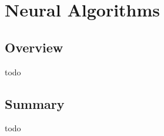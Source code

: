 


\chapter{Neural Algorithms}
\label{ch:neural}

\section{Overview}
todo



\section{Summary}
todo
